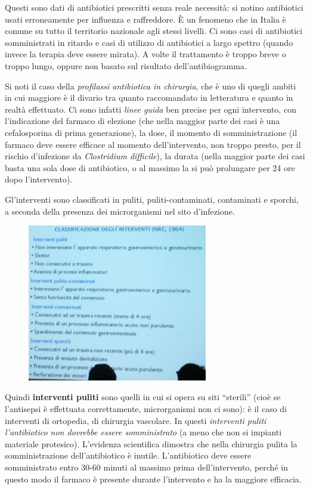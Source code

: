 Questi sono dati di antibiotici prescritti senza reale necessità: si
notino antibiotici usati erroneamente per influenza e raffreddore. È un
fenomeno che in Italia è comune su tutto il territorio nazionale agli
stessi livelli. Ci sono casi di antibiotici somministrati in ritardo e
casi di utilizzo di antibiotici a largo spettro (quando invece la
terapia deve essere mirata). A volte il trattamento è troppo breve o
troppo lungo, oppure non basato sul risultato dell'antibiogramma.

Si noti il caso della \emph{\emph{profilassi antibiotica in chirurgia}},
che è uno di quegli ambiti in cui maggiore è il divario tra quanto
raccomandato in letteratura e quanto in realtà effettuato. Ci sono
infatti \emph{linee guida} ben precise per ogni intervento, con
l'indicazione del farmaco di elezione (che nella maggior parte dei casi
è una cefalosporina di prima generazione), la dose, il momento di
somministrazione (il farmaco deve essere efficace al momento
dell'intervento, non troppo presto, per il rischio d'infezione da
\emph{Clostridium difficile}), la durata (nella maggior parte dei casi
basta una sola dose di antibiotico, o al massimo la si può prolungare
per 24 ore dopo l'intervento).

Gl'interventi sono classificati in puliti, puliti-contaminati,
contaminati e sporchi, a seconda della presenza dei microrganismi nel
sito d'infezione.

\begin{figure}[!ht]
\centering
	\includegraphics[width=0.7\textwidth]{19/image7.jpeg}
	\end{figure}

Quindi
\textbf{interventi puliti} sono quelli in cui si opera su siti
``sterili'' (cioè se l'antisepsi è effettuata correttamente,
microrganismi non ci sono): è il caso di interventi di ortopedia, di
chirurgia vascolare. In questi \emph{interventi puliti l'antibiotico non
dovrebbe essere somministrato} (a meno che non si impianti materiale
protesico). L'evidenza scientifica dimostra che nella chirurgia pulita
la somministrazione dell'antibiotico è inutile. L'antibiotico deve
essere somministrato entro 30-60 minuti al massimo prima
dell'intervento, perché in questo modo il farmaco è presente durante
l'intervento e ha la maggiore efficacia.

